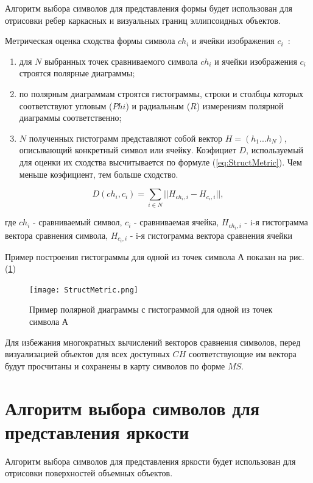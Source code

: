 Алгоритм выбора символов для представления формы будет использован для отрисовки ребер каркасных и визуальных границ эллипсоидных объектов.

Метрическая оценка сходства формы символа $ch_i$ и ячейки изображения $c_i$~\cite{Structure-based ASCII Art}:

\begin{enumerate}
    \item для $N$ выбранных точек сравниваемого символа $ch_i$ и ячейки изображения $c_i$ строятся полярные диаграммы;
    \item по полярным диаграммам строятся гистограммы, строки и столбцы которых соответствуют угловым ($Phi$) и радиальным ($R$) измерениям полярной диаграммы соответственно;
    \item $N$ полученных гистограмм представляют собой вектор $H=(h_1...h_N)$, описывающий конкретный символ или ячейку. Коэфициет $D$, используемый для оценки их сходства высчитывается по формуле (\ref{eq:StructMetric}). Чем меньше коэфициент, тем больше сходство.
\end{enumerate}

\begin{equation}
    \label{eq:StructMetric}
    D(ch_i, c_i) = \sum_{i \in N} ||H_{ch_i,i} - H_{c_i,i}||,
\end{equation}

где $ch_i$ - сравниваемый символ, $c_i$ - сравниваемая ячейка, $H_{ch_i,i}$ - i-я гистограмма вектора сравнения символа, $H_{c_i,i}$ - i-я гистограмма вектора сравнения ячейки

Пример построения гистограммы для одной из точек символа А показан на рис. (\ref{fig:StructMetric})

\begin{figure}[H]
    \centering
    \texttt{[image: StructMetric.png]}
    \caption{Пример полярной диаграммы с гистограммой для одной из точек символа А}
    \label{fig:StructMetric}
\end{figure}

Для избежания многократных вычислений векторов сравнения символов, перед визуализацией объектов для всех доступных $CH$ соответствующие им вектора будут просчитаны и сохранены в карту символов по форме $MS$.

\section{Алгоритм выбора символов для представления яркости}

Алгоритм выбора символов для представления яркости будет использован для отрисовки поверхностей объемных объектов.

